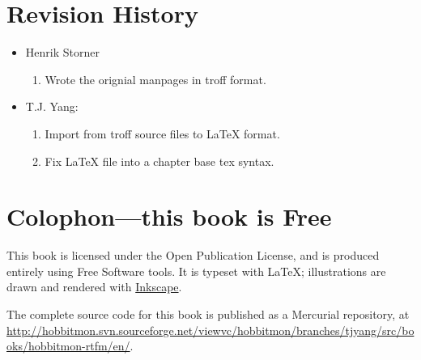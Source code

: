 \section{Revision History}

\begin{itemize}
\item Henrik Storner
 \begin{enumerate}
  \item Wrote the orignial manpages in troff format.
 \end{enumerate}

\item T.J. Yang:
 \begin{enumerate}
  \item Import from troff source files to LaTeX format.
  \item Fix LaTeX file into a chapter base tex syntax.
 \end{enumerate}

\end{itemize}

\section{Colophon---this book is Free}

This book is licensed under the Open Publication License, and is
produced entirely using Free Software tools.  It is typeset with
\LaTeX{}; illustrations are drawn and rendered with
\href{http://www.inkscape.org/}{Inkscape}.

The complete source code for this book is published as a Mercurial
repository, at \url{http://hobbitmon.svn.sourceforge.net/viewvc/hobbitmon/branches/tjyang/src/books/hobbitmon-rtfm/en/}.

